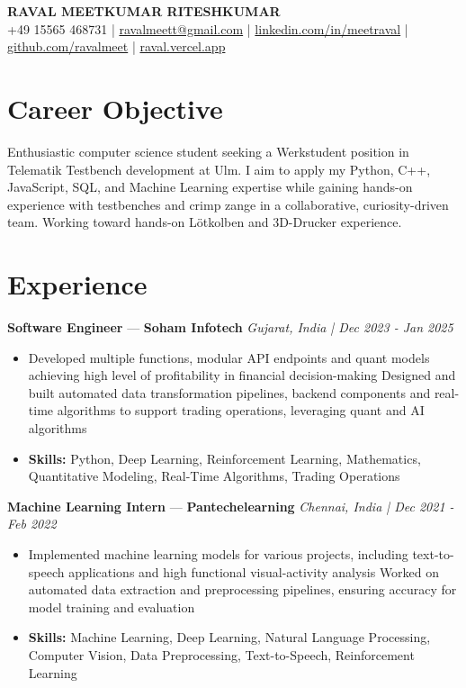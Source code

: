 \documentclass[a4paper,10pt]{article}
\begin{document}
\begin{center}
  {\Large\bfseries RAVAL MEETKUMAR RITESHKUMAR}\\[2pt]
  {\small +49 15565 468731 \;|\; \href{mailto:ravalmeett@gmail.com}{ravalmeett@gmail.com} \;|\; \href{https://www.linkedin.com/in/meetraval/}{linkedin.com/in/meetraval} \;|\; \href{https://github.com/ravalmeet}{github.com/ravalmeet} \;|\; \href{https://raval.vercel.app/}{raval.vercel.app}}
\end{center}
\vspace{-3pt}

\section*{Career Objective}
Enthusiastic computer science student seeking a Werkstudent position in Telematik Testbench development at Ulm. I aim to apply my Python, C++, JavaScript, SQL, and Machine Learning expertise while gaining hands-on experience with testbenches and crimp zange in a collaborative, curiosity-driven team. Working toward hands-on Lötkolben and 3D-Drucker experience.\par

\section*{Experience}
\textbf{Software Engineer} — \textbf{Soham Infotech} \hfill \textit{Gujarat, India \;|\; Dec 2023 - Jan 2025}\par
\vspace{1pt}
\begin{itemize}
  \item Developed multiple functions, modular API endpoints and quant models achieving high level of profitability in financial decision-making Designed and built automated data transformation pipelines, backend components and real-time algorithms to support trading operations, leveraging quant and AI algorithms
  \item \textbf{Skills:} Python, Deep Learning, Reinforcement Learning, Mathematics, Quantitative Modeling, Real-Time Algorithms, Trading Operations
\end{itemize}
\vspace{3pt}
\textbf{Machine Learning Intern} — \textbf{Pantechelearning} \hfill \textit{Chennai, India \;|\; Dec 2021 - Feb 2022}\par
\vspace{1pt}
\begin{itemize}
  \item Implemented machine learning models for various projects, including text-to-speech applications and high functional visual-activity analysis Worked on automated data extraction and preprocessing pipelines, ensuring accuracy for model training and evaluation
  \item \textbf{Skills:} Machine Learning, Deep Learning, Natural Language Processing, Computer Vision, Data Preprocessing, Text-to-Speech, Reinforcement Learning
\end{itemize}
\end{document}
